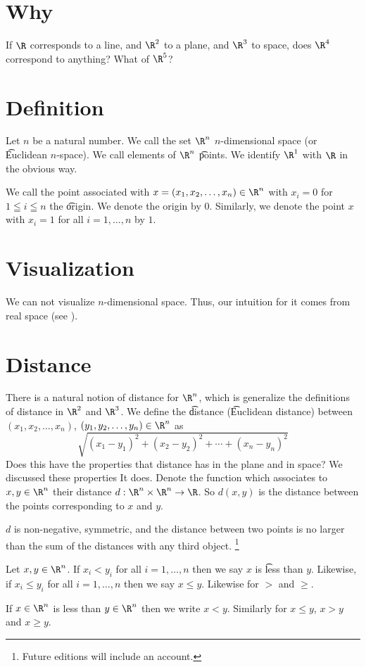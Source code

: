 
\section*{Why}

If $\R $ corresponds to a line, and $\R ^2$ to a plane, and $\R ^3$ to space, does $\R ^4$ correspond to anything? What of $\R ^5$?

\section*{Definition}

Let $n$ be a natural number.
We call the set $\R ^n$ \t{$n$-dimensional space} (or \t{Euclidean $n$-space}).
We call elements of $\R ^n$ \t{points}.
We identify $\R ^1$ with $\R $ in the obvious way.

We call the point associated with $x = (x_1, x_2, \dots , x_n) \in \R ^n$ with $x_i = 0$ for $1 \leqq i \leqq n$ the \t{origin}.
We denote the origin by $0$.
Similarly, we denote the point $x$ with $x_i = 1$ for all $i = 1, \dots , n$ by $1$.

\section*{Visualization}

We can not visualize $n$-dimensional space.
Thus, our intuition for it comes from real space (see ).

\section*{Distance}

There is a natural notion of distance for $\R ^n$, which is generalize the definitions of distance in $\R ^2$ and $\R ^3$.
We define the \t{distance} (\t{Euclidean distance}) between $(x_1, x_2, \dots , x_n)$, $(y_1, y_2, \dots , y_n) \in \R ^n$ as
  \[
\sqrt{(x_1 - y_1)^2 + (x_2 - y_2)^2 + \cdots + (x_n - y_n)^2}
  \]
Does this have the properties that distance has in the plane and in space?
We discussed these properties
It does.
Denote the function which associates to $x, y \in \R ^n$ their distance $d: \R ^n \times \R ^n \to \R $.
So $d(x, y)$ is the distance between the points corresponding to $x$ and $y$.

\begin{proposition}
$d$ is non-negative, symmetric, and the distance between two points is no larger than the sum of the distances with any third object.
  \ifhmode\unskip\fi\footnote{
Future editions will include an account.
  }
\end{proposition}


Let $x, y \in \R ^n$.
If $x_i < y_i$ for all $i = 1, \dots , n$ then we say $x$ is \t{less than} $y$.
Likewise, if $x_i \leq y_i$ for all $i = 1, \dots , n$ then we say $x \leq y$.
Likewise for $>$ and $\geq$.

If $x \in \R ^n$ is less than $y \in \R ^n$ then we write $x < y$.
Similarly for $x \leq y$, $x > y$ and $x \geq y$.
